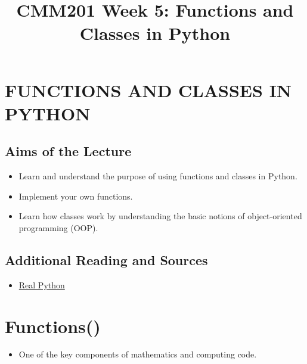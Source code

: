 \documentclass[11pt]{article}
\title{CMM201 Week 5: Functions and Classes in Python}
\date{}
\providecommand{\tightlist}{%
      \setlength{\itemsep}{0pt}\setlength{\parskip}{0pt}}
\begin{document}
    
    
    \maketitle
    
   


    \hypertarget{functions-and-classes-in-python}{%
\section{FUNCTIONS AND CLASSES IN
PYTHON}\label{functions-and-classes-in-python}}

    \hypertarget{aims-of-the-lecture}{%
\subsection{Aims of the Lecture}\label{aims-of-the-lecture}}

\begin{itemize}
\tightlist
\item
  Learn and understand the purpose of using functions and classes in
  Python.
\item
  Implement your own functions.
\item
  Learn how classes work by understanding the basic notions of
  object-oriented programming (OOP).
\end{itemize}

    \hypertarget{additional-reading-and-sources}{%
\subsection{Additional Reading and
Sources}\label{additional-reading-and-sources}}

\begin{itemize}
\tightlist
\item
  \href{https://realpython.com/lessons/classes-python/}{Real Python}
\end{itemize}

    \hypertarget{functions}{%
\section{Functions()}\label{functions}}

    \begin{itemize}
\tightlist
\item
  One of the key components of mathematics and computing code.
\end{itemize}
\end{document}
